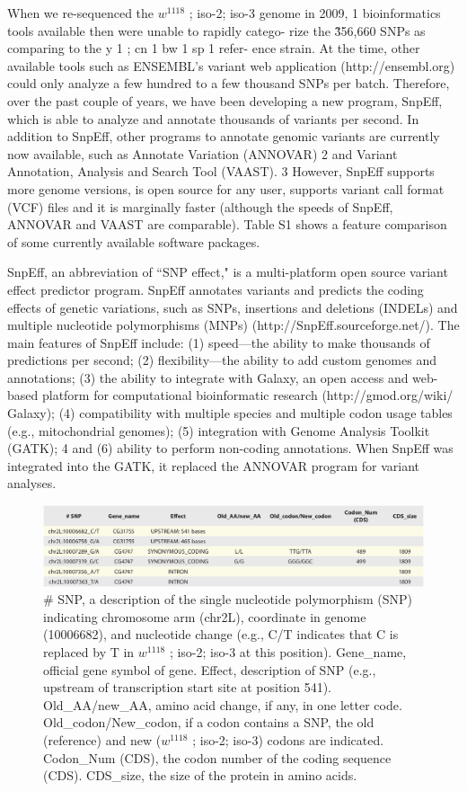 When we re-sequenced the $w^{1118}$ ; iso-2; iso-3 genome in 2009, 1 bioinformatics tools available then were unable to rapidly catego- rize the \~356,660 SNPs as comparing to the y 1 ; cn 1 bw 1 sp 1 refer- ence strain. At the time, other available tools such as ENSEMBL’s variant web application (http://ensembl.org) could only analyze a few hundred to a few thousand SNPs per batch. Therefore, over the past couple of years, we have been developing a new program, SnpEff, which is able to analyze and annotate thousands of variants per second. In addition to SnpEff, other programs to annotate genomic variants are currently now available, such as Annotate Variation (ANNOVAR) 2 and Variant Annotation, Analysis and Search Tool (VAAST). 3 However, SnpEff supports more genome versions, is open source for any user, supports variant call format (VCF) files and it is marginally faster (although the speeds of SnpEff, ANNOVAR and VAAST are comparable). Table S1 shows a feature comparison of some currently available software packages.

SnpEff, an abbreviation of ``SNP effect," is a multi-platform open source variant effect predictor program. SnpEff annotates variants and predicts the coding effects of genetic variations, such as SNPs, insertions and deletions (INDELs) and multiple nucleotide polymorphisms (MNPs) (http://SnpEff.sourceforge.net/).  The main features of SnpEff include: (1) speed—the ability to make thousands of predictions per second; (2) flexibility—the ability to add custom genomes and annotations; (3) the ability to integrate with Galaxy, an open access and web-based platform for computational bioinformatic research (http://gmod.org/wiki/ Galaxy); (4) compatibility with multiple species and multiple codon usage tables (e.g., mitochondrial genomes); (5) integration with Genome Analysis Toolkit (GATK); 4 and (6) ability to perform non-coding annotations. When SnpEff was integrated into the GATK, it replaced the ANNOVAR program for variant analyses.

\begin{figure}
    \centering
    \includegraphics[width=14cm]{snpeff_table1.png}
    \caption{\# SNP, a description of the single nucleotide polymorphism (SNP) indicating chromosome arm (chr2L), coordinate in genome (10006682), and nucleotide change (e.g., C/T indicates that C is replaced by T in $w^{1118}$ ; iso-2; iso-3 at this position). Gene\_name, official gene symbol of gene. Effect, description of SNP (e.g., upstream of transcription start site at position 541). Old\_AA/new\_AA, amino acid change, if any, in one letter code. Old\_codon/New\_codon, if a codon contains a SNP, the old (reference) and new ($w^{1118}$ ; iso-2; iso-3) codons are indicated. Codon\_Num (CDS), the codon number of the coding sequence (CDS). CDS\_size, the size of the protein in amino acids.}
    \label{fig:snpeffTab1}
\end{figure}

